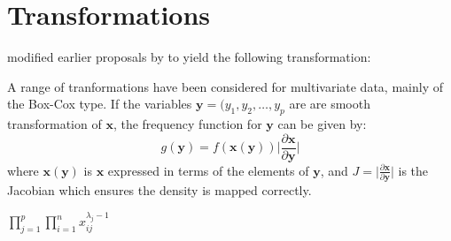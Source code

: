 


\section{Transformations}
\label{transform}

\cite{Box+Cox:1964} modified earlier proposals by \cite{Tukey:1957} to yield the following transformation:






A range of tranformations have been considered for multivariate data, mainly of the Box-Cox type.   If the variables $\boldsymbol{y} = (y_{1}, y_{2}, \ldots, y_{p}$ are are smooth transformation of $\boldsymbol{x}$, the frequency function for $\boldsymbol{y}$ can be given by:
\begin{displaymath}
g(\boldsymbol{y}) = f(\boldsymbol{x}(\boldsymbol{y}))\lvert \frac{\partial \boldsymbol{x}}{\partial \boldsymbol{y}} \rvert
\end{displaymath}
where $\boldsymbol{x}(\boldsymbol{y})$ is $\boldsymbol{x}$ expressed in terms of the elements of $\boldsymbol{y}$, and $J = \lvert \frac{\partial \boldsymbol{x}}{\partial \boldsymbol{y}} \rvert$ is the Jacobian %
which ensures the density is mapped correctly. 

$\prod_{j=1}^{p} \prod_{i=1}^{n} x_{ij}^{\lambda_{j}-1}$







